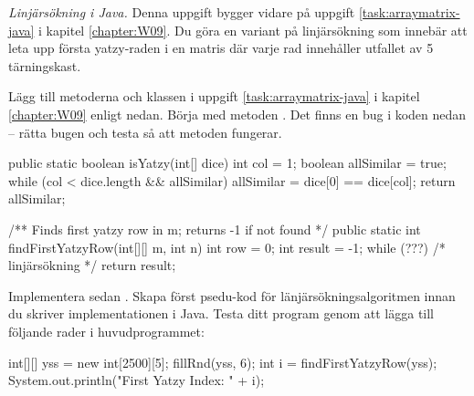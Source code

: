 

\Exercise{\ExeWeekTEN}

\begin{Goals}
\item 
\end{Goals}

\begin{Preparations}
\item 
\end{Preparations}

\BasicTasks %

\Task 

\Subtask 

\Task \emph{Linjärsökning i Java.} Denna uppgift bygger vidare på uppgift \ref{task:arraymatrix-java} i kapitel \ref{chapter:W09}. Du göra en variant på linjärsökning som innebär att leta upp första yatzy-raden i en matris där varje rad innehåller utfallet av 5 tärningskast. 

\Subtask Lägg till metoderna  och  klassen  i uppgift \ref{task:arraymatrix-java} i kapitel \ref{chapter:W09} enligt nedan. Börja med metoden  . Det finns en bug i koden nedan -- rätta bugen och testa så att metoden fungerar. 

\begin{Code}[language=Java]
    public static boolean isYatzy(int[] dice){
        int col = 1;
        boolean allSimilar = true;
        while (col < dice.length && allSimilar) {
          allSimilar = dice[0] == dice[col];
        }
        return allSimilar;
    }
    
    /** Finds first yatzy row in m; returns -1 if not found */
    public static int findFirstYatzyRow(int[][] m, int n){
        int row = 0;
        int result = -1;
        while (???) {
             /* linjärsökning  */ 
        }
        return result;
    }
\end{Code}

\Subtask Implementera sedan . Skapa först psedu-kod för länjärsökningsalgoritmen innan du skriver implementationen i Java. 
Testa ditt program genom att lägga till följande rader i huvudprogrammet:
\begin{Code}[language=Java]
        int[][] yss = new int[2500][5];
        fillRnd(yss, 6);
        int i = findFirstYatzyRow(yss);
        System.out.println("First Yatzy Index: " + i);
\end{Code}




